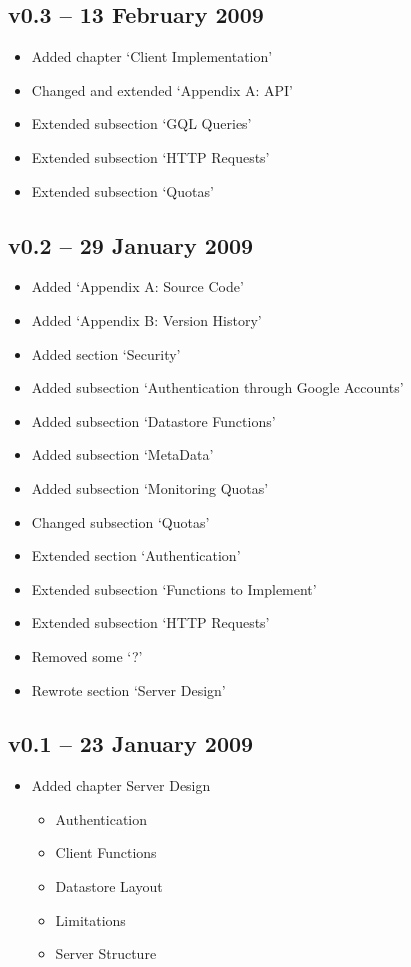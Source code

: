 \subsection*{v0.3 -- 13 February 2009}
\begin{itemize}
  \item Added chapter `Client Implementation'
  \item Changed and extended `Appendix A: API'
  \item Extended subsection `GQL Queries'
  \item Extended subsection `HTTP Requests'
  \item Extended subsection `Quotas'
\end{itemize}

\subsection*{v0.2 -- 29 January 2009}
\begin{itemize}
  \item Added `Appendix A: Source Code'
  \item Added `Appendix B: Version History'
  \item Added section `Security'
  \item Added subsection `Authentication through Google Accounts'
  \item Added subsection `Datastore Functions'
  \item Added subsection `MetaData'
  \item Added subsection `Monitoring Quotas'
  \item Changed subsection `Quotas'
  \item Extended section `Authentication'
  \item Extended subsection `Functions to Implement'
  \item Extended subsection `HTTP Requests'
  \item Removed some `?'
  \item Rewrote section `Server Design'
\end{itemize}

\subsection*{v0.1 -- 23 January 2009}
\begin{itemize}
  \item Added chapter Server Design
\begin{itemize}
  \item Authentication
  \item Client Functions
  \item Datastore Layout
  \item Limitations
  \item Server Structure
\end{itemize}
\end{itemize}